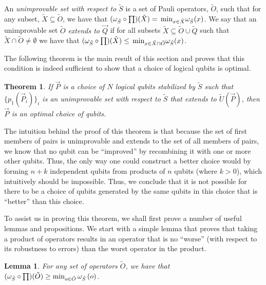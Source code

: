 \documentclass[twocolumn,showpacs,preprintnumbers,amsmath,amssymb,nofootinbib,pra,floatfix]{revtex4-1}
\newtheorem{theorem}{Theorem}
\newtheorem{lemma}{Lemma}
\newenvironment{definition}[1][Definition]{\begin{trivlist}
\item[\hskip \labelsep {\bfseries #1}]}{\end{trivlist}}
\newenvironment{remark}[1][Remark]{\begin{trivlist}
\item[\hskip \labelsep {\bfseries #1}]}{\end{trivlist}}
\newcommand{\lst}{\vec}
\newcommand{\set}{\tilde}
\begin{document}
\begin{definition}
An \emph{unimprovable set with respect to $\set S$} is a set of Pauli operators, $\set O$, such that for any subset, $\set X\subseteq \set O$, we have that $(\om_{\set S}\circ\prod)(\set X) = \min_{x\in\set X}\om_{\set S}(x)$.  We say that an unimprovable set $\set O$ \emph{extends to $\lst Q$} if for all subsets $\set X \subseteq \set O\cup\set Q$ such that $\set X\cap \set O \ne \emptyset$ we have that $(\om_{\set S}\circ\prod)(\set X) \le \min_{x\in\set X\cap \set O}\om_{\set S}(x)$.
\end{definition}
The following theorem is the main result of this section and proves that this condition is indeed sufficient to show that a choice of logical qubits is optimal.

\begin{theorem}
\label{theorem:optimality-condition}
If $\lst P$ is a choice of $N$ logical qubits stabilized by $\set S$ such that $\{p_1(\lst P_i)\}_i$ is an unimprovable set with respect to $\set S$ that extends to $\set U(\lst P)$, then $\lst P$ is an optimal choice of qubits.
\end{theorem}

\begin{remark}
The intuition behind the proof of this theorem is that because the set of first members of pairs is unimprovable and extends to the set of all members of pairs, we know that no qubit can be ``improved'' by recombining it with one or more other qubits.  Thus, the only way one could construct a better choice would by forming $n+k$ independent qubits from products of $n$ qubits (where $k>0$), which intuitively should be impossible.  Thus, we conclude that it is not possible for there to be a choice of qubits generated by the same qubits in this choice that is ``better'' than this choice.

To assist us in proving this theorem, we shall first prove a number of useful lemmas and propositions.  We start with a simple lemma that proves that taking a product of operators results in an operator that is no ``worse'' (with respect to its robustness to errors) than the worst operator in the product.
\end{remark}
\begin{lemma}
\label{combinations-can't-make-things-worse}
For any set of operators $\set O$, we have that $(\om_{\set S}\circ \prod)(\set O) \ge \text{min}_{o\in \set O}\,\om_{\set S}\paren{o}$.
\end{lemma}
\end{document}
